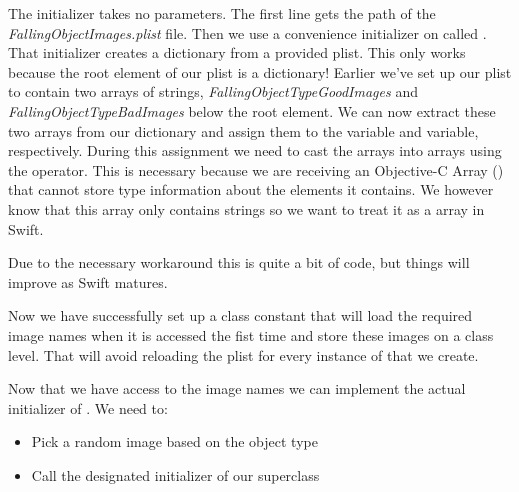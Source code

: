 The initializer takes no parameters. The first line gets the path of the
\textit{FallingObjectImages.plist} file. Then we use a convenience initializer
on  called . That
initializer creates a dictionary from a provided plist. This only works because
the root element of our plist is a dictionary! 
Earlier we've set up our plist to contain two arrays of strings,
\textit{FallingObjectTypeGoodImages} and \textit{FallingObjectTypeBadImages}
below the root element.
We can now extract these two arrays from our dictionary and assign them to the 
 variable and  variable, respectively. During
this assignment we need to cast the arrays into \inlinecode{[String]} arrays
using the  operator. This is necessary because we are receiving
an Objective-C Array () that cannot store type information
about the elements it contains. We however know that this array only contains
strings so we want to treat it as a \inlinecode{[String]} array in Swift.

Due to the necessary workaround this is quite a bit of code, but things will
improve as Swift matures. 

Now we have successfully set up a class constant that will load the required
image names when it is accessed the fist time and store these images on a class
level. That will avoid reloading the plist for every instance of
 that we create.
  
Now that we have access to the image names we can implement the actual
initializer of . We need to:
\begin{itemize}
  \item Pick a random image based on the object type
  \item Call the designated initializer of our superclass \ccsprite{}
\end{itemize}

